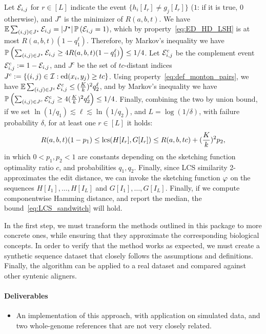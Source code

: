 Let $\mathcal{E}_{i,j}$ for $r\in[L]$ indicate the event $\{h_i[I_r]\neq g_j[I_r]\}$ ($1$: if it is true, $0$ otherwise), and $J^\star$ is the minimizer of $R(a,b,t)$. We have $\mathbb{E}\sum_{(i,j)\in J^\star} \mathcal{E}_{i,j} =  \left| J^\star \right|\mathbb{P}\left( \mathcal{E}_{i,j}=1 \right)$, which by property~\eqref{eq:ED_HD_LSH} is at most $R(a,b,t) {(1-q_1^\ell)}$. Therefore, by Markov's inequality we have $\mathbb{P}\left( \sum_{(i,j)\in J^\star} \mathcal{E}_{i,j} \ge 4R(a,b,t) {(1-q_1^\ell)} \right) \le 1/4$. Let $\mathcal{E}_{i,j}^c$ be the complement event $\mathcal{E}_{i,j}^c:=1-\mathcal{E}_{i,j}$, and $J^c$ be the set of $tc$-distant indices $J^c:=\left\{(i,j)\in \mathcal{I}: \operatorname{\mathrm{ed}}(x_i,y_j)\ge tc\right\}$. Using property~\eqref{eq:def_monton_pairs}, we have $\mathbb{E} \sum_{(i,j)\in J^c} \mathcal{E}_{i,j}^c \le (\frac{K}{k})^2 q_2^\ell$, and by Markov's inequality we have $\mathbb{P}\left( \sum_{(i,j)\in J^c} \mathcal{E}_{i,j}^c \ge 4(\frac{K}{k})^2 q_2^\ell \right)\le 1/4$. Finally, combining the two by union bound, if we set $\ln(1/q_1)\lesssim\ell\lesssim \ln(1/q_2)$, and $L=\log(1/\delta)$, with failure probability $\delta$, for at least one $r\in[L]$ it holds:
\begin{equation}
    \label{eq:LCS_sandwitch}
 R(a,b,t)(1 - p_1) \le \operatorname{\mathrm{lcs}}(H[I_r],G[I_r]) \le R(a,b,tc) + (\frac{K}{k})^2 p_2,
\end{equation}
in which $0<p_1,p_2<1$ are constants depending on the sketching function optimality ratio $c$, and probabilities $q_1,q_2$. Finally, since LCS similarity 2-approximates the edit distance, we can invoke the sketching function $\operatorname{\varphi}$ on the sequences $H[I_1],\dots,H[I_L]$ and $G[I_1],\dots,G[I_L]$. Finally, if we compute componentwise Hamming distance, and report the median, the bound~\eqref{eq:LCS_sandwitch} will hold.


In the first step, we must transform the methods outlined in this package to more concrete ones, while ensuring that they approximate the corresponding biological concepts. In order to verify that the method works as expected, we must create a synthetic sequence dataset that closely follows the assumptions and definitions. Finally, the algorithm can be applied to a real dataset and compared against other syntenic aligners.  


\paragraph{Deliverables}
\begin{itemize}
\item An implementation of this approach, with application on simulated data, and two whole-genome references that are not very closely related. 
\end{itemize}


